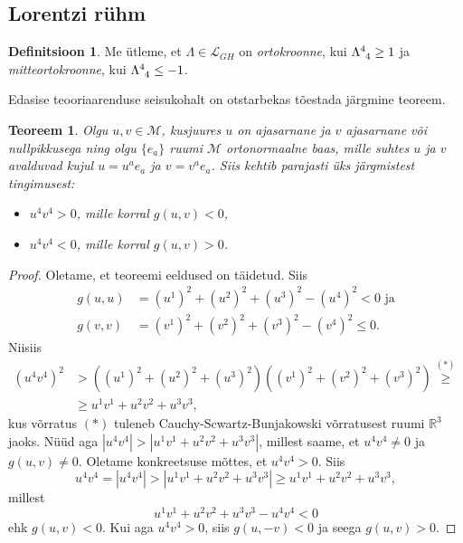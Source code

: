\documentclass[a4paper,12pt]{article}
\theoremstyle{plain}
\newtheorem{teoreem}{Teoreem}[section]
\theoremstyle{definition}
\newtheorem{definitsioon}{Definitsioon}[section]
\numberwithin{equation}{section}
\begin{document}
\subsection{Lorentzi rühm}

\begin{definitsioon}
Me ütleme, et $\Lambda \in \mathcal{L}_{GH}$ on \emph{ortokroonne}, kui $\Lambda\indices{^4_4} \geq 1$ ja \emph{mitteortokroonne}, kui $\Lambda\indices{^4_4} \leq -1$.
\end{definitsioon}

Edasise teooriaarenduse seisukohalt on otstarbekas tõestada järgmine teoreem.
\begin{teoreem} \textnormal{\cite[teoreem 1.3.1]{Naber}} \label{teoreem:ajasarnased_vektorid}
Olgu $u, v \in \mathcal{M}$, kusjuures $u$ on ajasarnane ja $v$ ajasarnane või nullpikkusega ning olgu $\{e_a\}$ ruumi $\mathcal{M}$ ortonormaalne baas, mille suhtes $u$ ja $v$ avalduvad kujul $u = u^a e_a$ ja $v = v^a e_a$. Siis kehtib parajasti üks järgmistest tingimusest:
\begin{itemize}
\item[(a)] $u^4 v^4 > 0$, mille korral $g\left(u, v\right) < 0$,
\item[(b)] $u^4 v^4 < 0$, mille korral $g\left(u, v\right) > 0$.
\end{itemize}
\end{teoreem}
\begin{proof}
Oletame, et teoreemi eeldused on täidetud. Siis
\begin{align*}
g \left(u, u\right) &= \left(u^1\right)^2 + \left(u^2\right)^2 + \left(u^3\right)^2 - \left(u^4\right)^2 < 0 \text{ ja} \\
g \left(v, v\right) &= \left(v^1\right)^2 + \left(v^2\right)^2 + \left(v^3\right)^2 - \left(v^4\right)^2 \leq 0.
\end{align*}
Niisiis
\begin{align*}
\left(u^4 v^4\right)^2 &> \left( \left(u^1\right)^2 + \left(u^2\right)^2 + \left(u^3\right)^2 \right) \left( \left(v^1\right)^2 + \left(v^2\right)^2 + \left(v^3\right)^2 \right) \overset{(*)}{\geq} \\
&\geq u^1 v^1 + u^2 v^2 + u^3 v^3,
\end{align*}
kus võrratus $(*)$ tuleneb Cauchy-Scwartz-Bunjakowski võrratusest ruumi $\mathbb{R}^3$ jaoks.
Nüüd aga $|u^4 v^4| > |u^1 v^1 + u^2 v^2 + u^3 v^3|$, millest saame, et $u^4 v^4 \neq 0$ ja $g\left (u, v\right ) \neq 0$.
Oletame konkreetsuse mõttes, et $u^4 v^4 > 0$. Siis
\[u^4 v^4 = |u^4 v^4| > |u^1 v^1 + u^2 v^2 + u^3 v^3| \geq u^1 v^1 + u^2 v^2 + u^3 v^3,\]
millest
\[u^1 v^1 + u^2 v^2 + u^3 v^3 - u^4 v^4 < 0\]
ehk $g\left (u, v\right ) < 0$.
Kui aga $u^4 v^4 > 0$, siis $g\left (u, -v\right ) < 0$ ja seega $g \left (u, v\right ) > 0$.
\end{proof}
\end{document}
